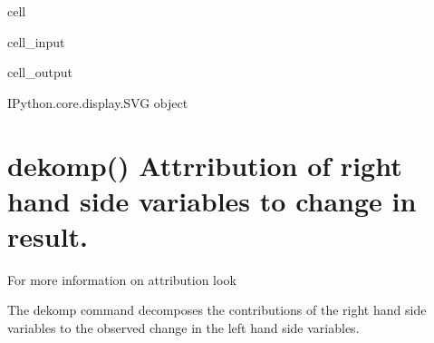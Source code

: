 \documentclass[letterpaper,10pt,english]{jupyterBook}
\begin{document}
\begin{sphinxuseclass}{cell}\begin{sphinxVerbatimInput}

\begin{sphinxuseclass}{cell_input}
\begin{sphinxVerbatim}[commandchars=\\\{\}]
\PYG{p}{[}\PYG{p}{]}  
\end{sphinxVerbatim}

\end{sphinxuseclass}\end{sphinxVerbatimInput}
\begin{sphinxVerbatimOutput}

\begin{sphinxuseclass}{cell_output}
\begin{sphinxVerbatim}[commandchars=\\\{\}]
\PYGZlt{}IPython.core.display.SVG object\PYGZgt{}
\end{sphinxVerbatim}

\end{sphinxuseclass}\end{sphinxVerbatimOutput}

\end{sphinxuseclass}

\section{dekomp() Attrribution of right hand side variables to change in result.}
\label{\detokenize{content/Python/modelflow_features:dekomp-attrribution-of-right-hand-side-variables-to-change-in-result}}
\sphinxAtStartPar
For more information on attribution look {\hyperref[\detokenize{content/howto/attribution/Attribution background::doc}]{}}

\sphinxAtStartPar
The dekomp command decomposes the contributions of the right hand side variables to the observed change in the left hand side variables.
\end{document}
